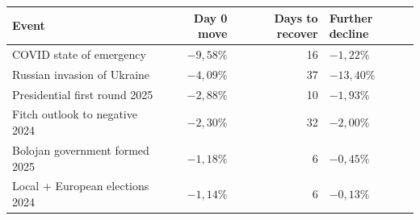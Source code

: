 {\footnotesize\setlength{\tabcolsep}{4pt}
\begin{tabular}{lrrl}
\toprule
Event & Day 0 move & Days to recover & Further decline \\
\midrule
COVID state of emergency & $-9{,}58\%$ & 16 & $-1{,}22\%$ \\
Russian invasion of Ukraine & $-4{,}09\%$ & 37 & $-13{,}40\%$ \\
Presidential first round 2025 & $-2{,}88\%$ & 10 & $-1{,}93\%$ \\
Fitch outlook to negative 2024 & $-2{,}30\%$ & 32 & $-2{,}00\%$ \\
Bolojan government formed 2025 & $-1{,}18\%$ & 6 & $-0{,}45\%$ \\
Local + European elections 2024 & $-1{,}14\%$ & 6 & $-0{,}13\%$ \\
\bottomrule
\end{tabular}}
